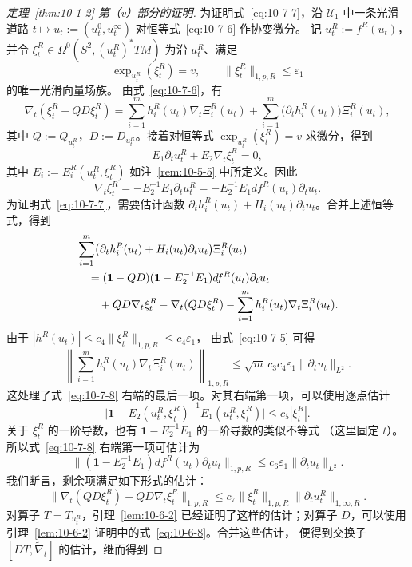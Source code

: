 \begin{proof}[定理~\ref{thm:10-1-2} 第（v）部分的证明]
为证明式~\eqref{eq:10-7-7}，沿 $\mathcal U_1$ 中一条光滑道路
$t\mapsto u_t:=(u_t^0,u_t^\infty)$ 对恒等式~\eqref{eq:10-7-6} 作协变微分。
记 $u_t^R:=f^R(u_t)$，并令
$\xi_t^R\in\Omega^0(S^2,(u_t^R)^*TM)$ 为沿 $u_t^R$、满足
\[
  \exp_{u_t^R}(\xi_t^R)=v,
  \qquad \lVert\xi_t^R\rVert_{1,p,R}\leq\varepsilon_1
\]
的唯一光滑向量场族。
由式~\eqref{eq:10-7-6}，有
\[
  \nabla_t(\xi_t^R-QD\xi_t^R)
  =\sum_{i=1}^m h_i^R(u_t)\nabla_t\Xi_i^R(u_t)
   +\sum_{i=1}^m\bigl(\partial_t h_i^R(u_t)\bigr)\Xi_i^R(u_t),
\]
其中 $Q:=Q_{u_t^R}$，$D:=D_{u_t^R}$。接着对恒等式
$\exp_{u_t^R}(\xi_t^R)=v$ 求微分，得到
\[
  E_1\partial_tu_t^R+E_2\nabla_t\xi_t^R=0,
\]
其中 $E_i:=E_i^R(u_t^R,\xi_t^R)$ 如注~\ref{rem:10-5-5} 中所定义。因此
\[
  \nabla_t\xi_t^R
  =-E_2^{-1}E_1\partial_tu_t^R
  =-E_2^{-1}E_1df^R(u_t)\partial_tu_t.
\]
为证明式~\eqref{eq:10-7-7}，需要估计函数
$\partial_th_i^R(u_t)+H_i(u_t)\partial_tu_t$。合并上述恒等式，得到
\begin{align}
 &\sum_{i=1}^m
 \bigl(\partial_th_i^R(u_t)+H_i(u_t)\partial_tu_t\bigr)\Xi_i^R(u_t)
 \notag\\
 &\quad=
 (\mathbf 1-QD)(\mathbf 1-E_2^{-1}E_1)df^R(u_t)\partial_tu_t
 \label{eq:10-7-8}\\
 &\qquad{}+QD\nabla_t\xi_t^R-\nabla_t(QD\xi_t^R)
 -\sum_{i=1}^m h_i^R(u_t)\nabla_t\Xi_i^R(u_t).
 \notag
\end{align}
由于
$|h^R(u_t)|\leq c_4\lVert\xi_t^R\rVert_{1,p,R}\leq c_4\varepsilon_1$，
由式~\eqref{eq:10-7-5} 可得
\[
  \left\lVert
  \sum_{i=1}^m h_i^R(u_t)\nabla_t\Xi_i^R(u_t)
  \right\rVert_{1,p,R}
  \leq\sqrt m\,c_3c_4\varepsilon_1
  \lVert\partial_tu_t\rVert_{L^2}.
\]
这处理了式~\eqref{eq:10-7-8} 右端的最后一项。对其右端第一项，可以使用逐点估计
\[
  \bigl|\mathbf 1-E_2(u_t^R,\xi_t^R)^{-1}E_1(u_t^R,\xi_t^R)\bigr|
  \leq c_5|\xi_t^R|.
\]
关于 $\xi_t^R$ 的一阶导数，也有 $\mathbf 1-E_2^{-1}E_1$ 的一阶导数的类似不等式
（这里固定 $t$）。所以式~\eqref{eq:10-7-8} 右端第一项可估计为
\[
  \bigl\lVert(\mathbf 1-E_2^{-1}E_1)df^R(u_t)\partial_tu_t
  \bigr\rVert_{1,p,R}
  \leq c_6\varepsilon_1\lVert\partial_tu_t\rVert_{L^2}.
\]
我们断言，剩余项满足如下形式的估计：
\begin{equation}\label{eq:10-7-9}
  \bigl\lVert\nabla_t(QD\xi_t^R)-QD\nabla_t\xi_t^R\bigr\rVert_{1,p,R}
  \leq c_7\lVert\xi_t^R\rVert_{1,p,R}
  \lVert\partial_tu_t^R\rVert_{1,\infty,R}.
\end{equation}
对算子 $T=T_{u_t^R}$，引理~\ref{lem:10-6-2} 已经证明了这样的估计；对算子
$D$，可以使用引理~\ref{lem:10-6-2} 证明中的式~\eqref{eq:10-6-8}。合并这些估计，
便得到交换子 $[DT,\widetilde\nabla_t]$ 的估计，继而得到

\end{proof}
